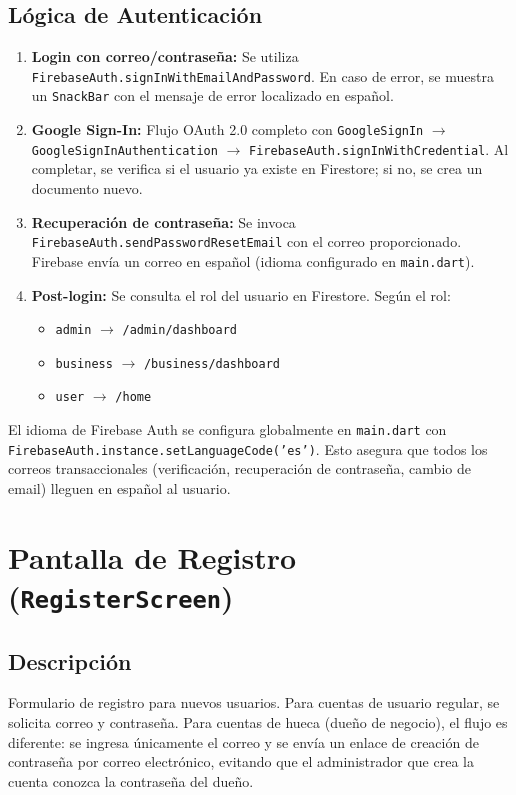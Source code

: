 \documentclass[11pt, a4paper, oneside]{report}
\begin{document}
\subsection{Lógica de Autenticación}
\begin{enumerate}
  \item \textbf{Login con correo/contraseña:} Se utiliza \texttt{FirebaseAuth.signInWithEmailAndPassword}. En caso de error, se muestra un \texttt{SnackBar} con el mensaje de error localizado en español.
  \item \textbf{Google Sign-In:} Flujo OAuth 2.0 completo con \texttt{GoogleSignIn} $\rightarrow$ \texttt{GoogleSignInAuthentication} $\rightarrow$ \texttt{FirebaseAuth.signInWithCredential}. Al completar, se verifica si el usuario ya existe en Firestore; si no, se crea un documento nuevo.
  \item \textbf{Recuperación de contraseña:} Se invoca \texttt{FirebaseAuth.sendPasswordResetEmail} con el correo proporcionado. Firebase envía un correo en español (idioma configurado en \texttt{main.dart}).
  \item \textbf{Post-login:} Se consulta el rol del usuario en Firestore. Según el rol:
  \begin{itemize}
    \item \texttt{admin} $\rightarrow$ \texttt{/admin/dashboard}
    \item \texttt{business} $\rightarrow$ \texttt{/business/dashboard}
    \item \texttt{user} $\rightarrow$ \texttt{/home}
  \end{itemize}
\end{enumerate}

\begin{techbox}
  El idioma de Firebase Auth se configura globalmente en \texttt{main.dart} con \texttt{FirebaseAuth.instance.setLanguageCode('es')}. Esto asegura que todos los correos transaccionales (verificación, recuperación de contraseña, cambio de email) lleguen en español al usuario.
\end{techbox}

\section{Pantalla de Registro (\texttt{RegisterScreen})}

\subsection{Descripción}
Formulario de registro para nuevos usuarios. Para cuentas de usuario regular, se solicita correo y contraseña. Para cuentas de hueca (dueño de negocio), el flujo es diferente: se ingresa únicamente el correo y se envía un enlace de creación de contraseña por correo electrónico, evitando que el administrador que crea la cuenta conozca la contraseña del dueño.
\end{document}
